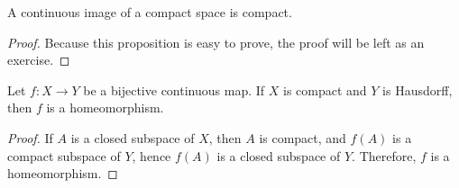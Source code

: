 \begin{prop}
    A continuous image of a compact space is compact.
\end{prop}
\begin{proof}
    Because this proposition is easy to prove, the proof will be left as an exercise.
\end{proof}

\begin{prop}
    Let $f: X\rightarrow Y$ be a bijective continuous map.
    If $X$ is compact and $Y$ is Hausdorff, then $f$ is a homeomorphism.
\end{prop}
\begin{proof}
    If $A$ is a closed subspace of $X$, then $A$ is compact, and $f(A)$ is a compact subspace of $Y$, hence $f(A)$ is a closed subspace of $Y$.
    Therefore, $f$ is a homeomorphism.
\end{proof}

